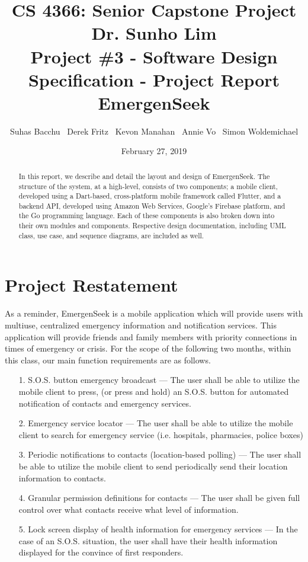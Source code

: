 \documentclass[10pt, a4paper]{article}
\title{\large CS 4366: Senior Capstone Project \\ Dr. Sunho Lim \\ Project \#3 - Software Design Specification - Project Report \\ EmergenSeek}
\author{Suhas Bacchu \ Derek Fritz \ Kevon Manahan \ Annie Vo \ Simon Woldemichael}
\date{February 27, 2019}
\begin{document}
\maketitle
\vspace{-1cm}
\begin{abstract}
In this report, we describe and detail the layout and design of EmergenSeek. The structure of the system, at a high-level, consists of two components; a mobile client, developed using a Dart-based, cross-platform mobile framework called Flutter, and a backend API, developed using Amazon Web Services, Google's Firebase platform, and the Go programming language. Each of these components is also broken down into their own modules and components. Respective design documentation, including UML class, use case, and sequence diagrams, are included as well.
\end{abstract}

\section{Project Restatement}
As a reminder, EmergenSeek is a mobile application which will provide users with multiuse, centralized emergency information and notification services. This application will provide friends and family members with priority connections in times of emergency or crisis. For the scope of the following two months, within this class, our main function requirements are as follows.
\begin{enumerate}
	\item[1.] S.O.S. button emergency broadcast --- The user shall be able to utilize the mobile client to press, (or press and hold) an S.O.S. button for automated notification of contacts and emergency services.
	\item[2.] Emergency service locator --- The user shall be able to utilize the mobile client to search for emergency service (i.e. hospitals, pharmacies, police boxes)
	\item[3.] Periodic notifications to contacts (location-based polling) --- The user shall be able to utilize the mobile client to send periodically send their location information to contacts.
	\item[4.] Granular permission definitions for contacts --- The user shall be given full control over what contacts receive what level of information.
	\item[5.] Lock screen display of health information for emergency services --- In the case of an S.O.S. situation, the user shall have their health information displayed for the convince of first responders.
\end{enumerate}
\end{document}

